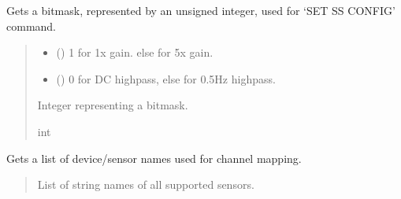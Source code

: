 \documentclass[letterpaper,10pt,english]{sphinxmanual}
\begin{document}
\begin{fulllineitems}
\begin{fulllineitems}
\label{\detokenize{PodDevice_8401HR:PodDevice_8401HR.POD_8401HR.GetSSConfigBitmask}}
\pysigstartsignatures
{}
\pysigstopsignatures
\sphinxAtStartPar
Gets a bitmask, represented by an unsigned integer, used for ‘SET SS CONFIG’ command.
\begin{quote}\begin{description}
\begin{itemize}
\item {} 
\sphinxAtStartPar
{} () \textendash{} 1 for 1x gain. else for 5x gain.

\item {} 
\sphinxAtStartPar
{} () \textendash{} 0 for DC highpass, else for 0.5Hz highpass.

\end{itemize}

\sphinxAtStartPar
Integer representing a bitmask.

\sphinxAtStartPar
int

\end{description}\end{quote}

\end{fulllineitems}


\begin{fulllineitems}
\label{\detokenize{PodDevice_8401HR:PodDevice_8401HR.POD_8401HR.GetSupportedPreampDevices}}
\pysigstartsignatures
{}
\pysigstopsignatures
\sphinxAtStartPar
Gets a list of device/sensor names used for channel mapping.
\begin{quote}\begin{description}
\sphinxAtStartPar
List of string names of all supported sensors.


\end{description}
\end{quote}
\end{fulllineitems}
\end{fulllineitems}
\end{document}

